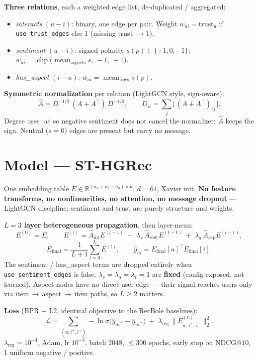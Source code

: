 \documentclass[10pt]{article}
\newenvironment{titems}
  {\begin{itemize}\setlength\itemsep{1.5pt}\setlength\parskip{0pt}\small}
  {\end{itemize}}
\newcommand{\code}[1]{\texttt{\small #1}}
\newcommand{\Ahat}{\widehat{A}}
\begin{document}
\textbf{Three relations}, each a weighted edge list, de-duplicated / aggregated:
\begin{titems}
\item \emph{interacts} $(u\!-\!i)$: binary, one edge per pair. Weight
      $w_{ui} = \text{trust}_u$ if \code{use\_trust\_edges} else $1$ (missing trust $\to 1$).
\item \emph{sentiment} $(u\!-\!i)$: signed polarity $s(p)\in\{+1,0,-1\}$;
      $w_{ui} = \operatorname{clip}\!\big(\operatorname{mean}_{\text{aspects}} s,\,-1,\,+1\big)$.
\item \emph{has\_aspect} $(i\!-\!a)$: $w_{ia} = \operatorname{mean}_{\text{rows}} s(p)$.
\end{titems}

\textbf{Symmetric normalization} per relation (LightGCN style, sign-aware):
\[
\Ahat = D^{-1/2}\,(A + A^\top)\,D^{-1/2}, \qquad
D_{ii} = \sum_j \big|\,(A+A^\top)_{ij}\,\big|.
\]
Degree uses $|w|$ so negative sentiment does not cancel the normalizer; $\Ahat$ keeps the
sign. Neutral ($s=0$) edges are present but carry no message.

\section{Model --- ST-HGRec}
One embedding table $E \in \mathbb{R}^{(n_u+n_i+n_a)\times d}$, $d=64$, Xavier init.
\textbf{No feature transforms, no nonlinearities, no attention, no message dropout} ---
LightGCN discipline; sentiment and trust are purely structure and weights.

\textbf{$L=3$ layer heterogeneous propagation}, then layer-mean:
\[
E^{(0)} = E, \qquad
E^{(l)} = \Ahat_{\text{int}}E^{(l-1)}
\;+\; \lambda_s\,\Ahat_{\text{sent}}E^{(l-1)}
\;+\; \lambda_a\,\Ahat_{\text{asp}}E^{(l-1)},
\]
\[
E_{\text{final}} = \frac{1}{L+1}\sum_{l=0}^{L} E^{(l)}, \qquad
\hat{y}_{ui} = E_{\text{final}}[u]^\top E_{\text{final}}[i].
\]
The sentiment / has\_aspect terms are dropped entirely when \code{use\_sentiment\_edges} is
false. $\lambda_s=\lambda_a=\lambda_t=1$ are \textbf{fixed} (config-exposed, not learned).
Aspect nodes have no direct user edge --- their signal reaches users only via
item\,$\to$\,aspect\,$\to$\,item paths, so $L\ge 2$ matters.

\textbf{Loss} (BPR + L2, identical objective to the RecBole baselines):
\[
\mathcal{L} = \sum_{(u,i^+,i^-)} -\ln \sigma\!\big(\hat{y}_{u i^+} - \hat{y}_{u i^-}\big)
\;+\; \lambda_{\text{reg}}\,\big\lVert E^{(0)}_{u,\,i^+,\,i^-}\big\rVert_2^2 .
\]
$\lambda_{\text{reg}}=10^{-4}$, Adam, lr $10^{-3}$, batch 2048, $\le$300 epochs, early stop
on $\mathrm{NDCG}@10$, 1 uniform negative / positive.
\end{document}
